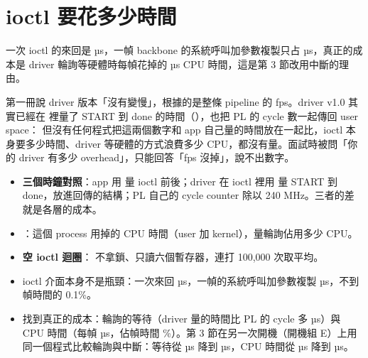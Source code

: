 \section{ioctl 要花多少時間}
\label{sec:ioctl}

\begin{oneline}
一次 ioctl 的來回是 \ioctlUs{} µs，一幀 backbone 的系統呼叫加參數複製只占 \bbSysUs{} µs，真正的成本是 driver 輪詢等硬體時每幀花掉的 \bbCpuUs{} µs CPU 時間，這是第 3 節改用中斷的理由。
\end{oneline}

\begin{before}
第一冊說 driver 版本「沒有變慢」，根據的是整條 pipeline 的 fps。driver v1.0 其實已經在  裡量了 START 到 done 的時間（），也把 PL 的 cycle 數一起傳回 user space：
但沒有任何程式把這兩個數字和 app 自己量的時間放在一起比，ioctl 本身要多少時間、driver 等硬體的方式浪費多少 CPU，都沒有量。面試時被問「你的 driver 有多少 overhead」，只能回答「fps 沒掉」，說不出數字。
\end{before}

\begin{tech}
\begin{itemize}
\item \textbf{三個時鐘對照}：app 用  量 ioctl 前後；driver 在 ioctl 裡用  量 START 到 done，放進回傳的結構；PL 自己的 cycle counter 除以 240 MHz。三者的差就是各層的成本。
\item \textbf{}：這個 process 用掉的 CPU 時間（user 加 kernel），量輪詢佔用多少 CPU。
\item \textbf{空 ioctl 迴圈}： 不拿鎖、只讀六個暫存器，連打 100,000 次取平均。
\end{itemize}
\end{tech}

\begin{gain}
\begin{itemize}
\item ioctl 介面本身不是瓶頸：一次來回 \ioctlUs{} µs，一幀的系統呼叫加參數複製 \bbSysUs{} µs，不到幀時間的 0.1\%。
\item 找到真正的成本：輪詢的等待（driver 量的時間比 PL 的 cycle 多 \bbWaitUs{} µs）與 CPU 時間（每幀 \bbCpuUs{} µs，佔幀時間 \bbCpuPct{}\%）。第 3 節在另一次開機（開機組 E）上用同一個程式比較輪詢與中斷：等待從 \pollWaitUs{} µs 降到 \irqWaitUs{} µs，CPU 時間從 \pollCpuUs{} µs 降到 \irqCpuUs{} µs。
\end{itemize}
\end{gain}

